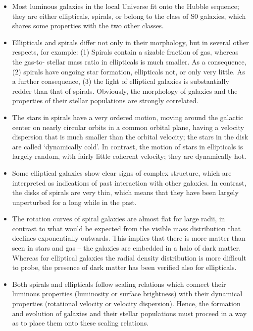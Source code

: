 \documentclass[a4paper,11pt]{article}
\begin{document}
\begin{itemize}
    \item Most luminous galaxies in the local Universe fit onto the Hubble sequence; they are either ellipticals, spirals, or belong to the class of S0 galaxies, which shares some properties with the two other classes.
    \item Ellipticals and spirals differ not only in their morphology, but in several other respects, for example: (1) Spirals contain a sizable fraction of gas, whereas the gas-to- stellar mass ratio in ellipticals is much smaller. As a consequence, (2) spirals have ongoing star formation, ellipticals not, or only very little. As a further consequence, (3) the light of elliptical galaxies is substantially redder than that of spirals. Obviously, the morphology of galaxies and the properties of their stellar populations are strongly correlated.
    \item The stars in spirals have a very ordered motion, moving around the galactic center on nearly circular orbits in a common orbital plane, having a velocity dispersion that is much smaller than the orbital velocity; the stars in the disk are called `dynamically cold'. In contrast, the motion of stars in ellipticals is largely random, with fairly little coherent velocity; they are dynamically hot.
    \item Some elliptical galaxies show clear signs of complex structure, which are interpreted as indications of past interaction with other galaxies. In contrast, the disks of spirals are very thin, which means that they have been largely unperturbed for a long while in the past.
    \item The rotation curves of spiral galaxies are almost flat for large radii, in contrast to what would be expected from the visible mass distribution that declines exponentially outwards. This implies that there is more matter than seen in stars and gas -- the galaxies are embedded in a halo of dark matter. Whereas for elliptical galaxies the radial density distribution is more difficult to probe, the presence of dark matter has been verified also for ellipticals.
    \item Both spirals and ellipticals follow scaling relations which connect their luminous properties (luminosity or surface brightness) with their dynamical properties (rotational velocity or velocity dispersion). Hence, the formation and evolution of galaxies and their stellar populations must proceed in a way as to place them onto these scaling relations.
\end{itemize}
\end{document}
